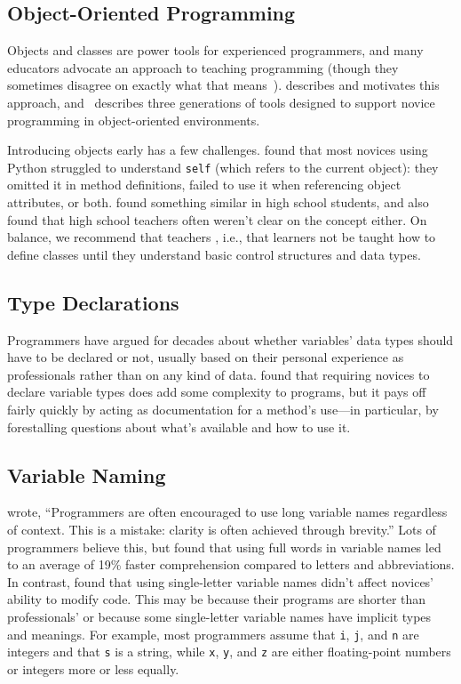 \subsection*{Object-Oriented Programming}

Objects and classes are power tools for experienced programmers,
and many educators advocate an  approach to teaching programming
(though they sometimes disagree on exactly what that means~\cite{Benn2007b}).
\cite{Sorv2014} describes and motivates this approach,
and~\cite{Koll2015} describes three generations of tools
designed to support novice programming in object-oriented environments.

Introducing objects early has a few challenges.
\cite{Mill2016b} found that most novices using Python
struggled to understand \texttt{self}
(which refers to the current object):
they omitted it in method definitions,
failed to use it when referencing object attributes,
or both.
\cite{Rago2017} found something similar in high school students,
and also found that high school teachers often weren't clear on the concept either.
On balance,
we recommend that teachers ,
i.e.,
that learners not be taught how to define classes
until they understand basic control structures and data types.

\subsection*{Type Declarations}

Programmers have argued for decades about whether variables' data types should have to be declared or not,
usually based on their personal experience as professionals
rather than on any kind of data.
\cite{Endr2014,Fisc2015} found that requiring novices to declare variable types does add some complexity to programs,
but it pays off fairly quickly by acting as documentation for a method's use---in particular,
by forestalling questions about what's available and how to use it.

\subsection*{Variable Naming}

\cite{Kern1999} wrote,
``Programmers are often encouraged to use long variable names regardless of context.
This is a mistake: clarity is often achieved through brevity.''
Lots of programmers believe this,
but \cite{Hofm2017} found that using full words in variable names
led to an average of 19\% faster comprehension compared to letters and abbreviations.
In contrast,
\cite{Beni2017} found that using single-letter variable names didn't affect novices' ability to modify code.
This may be because their programs are shorter than professionals'
or because some single-letter variable names have implicit types and meanings.
For example,
most programmers assume that \texttt{i}, \texttt{j}, and \texttt{n} are integers
and that \texttt{s} is a string,
while \texttt{x}, \texttt{y}, and \texttt{z} are either floating-point numbers or integers
more or less equally.

